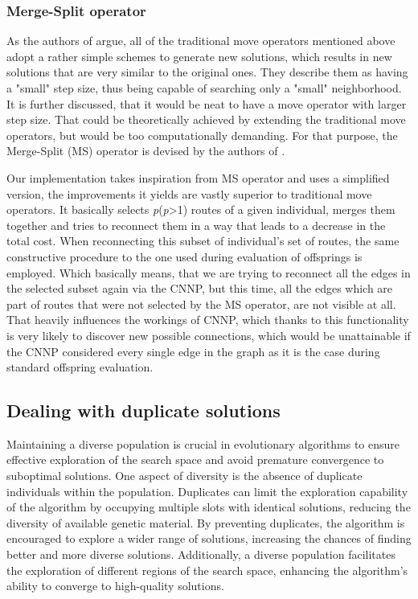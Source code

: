 \documentclass[twoside]{ctuthesis}
\theoremstyle{plain}
\theoremstyle{definition}
\theoremstyle{note}
\begin{document}
\subsubsection{Merge-Split operator}
As the authors of \cite{tang2009memetic} argue, all of the traditional move operators mentioned above adopt a rather simple schemes to generate new solutions, which results in new solutions that are very similar to the original ones. They describe them as having a "small" step size, thus being capable of searching only a "small" neighborhood.
It is further discussed, that it would be neat to have a move operator with larger step size. That could be theoretically achieved by extending the traditional move operators, but would be too computationally demanding. For that purpose, the Merge-Split (MS) operator is devised by the authors of \cite{tang2009memetic}.

Our implementation takes inspiration from MS operator and uses a simplified version, the improvements it yields are vastly superior to traditional move operators.
It basically selects \emph{p}(\emph{p}>1) routes of a given individual, merges them together and tries to reconnect them in a way that leads to a decrease in the total cost. When reconnecting this subset of individual's set of routes, the same constructive procedure to the one used during evaluation of offsprings is employed. Which basically means, that we are trying to reconnect all the edges in the selected subset again via the CNNP, but this time, all the edges which are part of routes that were not selected by the MS operator, are not visible at all. That heavily influences the workings of CNNP, which thanks to this functionality is very likely to discover new possible connections, which would be unattainable if the CNNP considered every single edge in the graph as it is the case during standard offspring evaluation. 


\subsection{Dealing with duplicate solutions}
\label{sec:duplicates}
Maintaining a diverse population is crucial in evolutionary algorithms to ensure effective exploration of the search space and avoid premature convergence to suboptimal solutions. One aspect of diversity is the absence of duplicate individuals within the population. Duplicates can limit the exploration capability of the algorithm by occupying multiple slots with identical solutions, reducing the diversity of available genetic material. By preventing duplicates, the algorithm is encouraged to explore a wider range of solutions, increasing the chances of finding better and more diverse solutions. Additionally, a diverse population facilitates the exploration of different regions of the search space, enhancing the algorithm's ability to converge to high-quality solutions.
\end{document}
